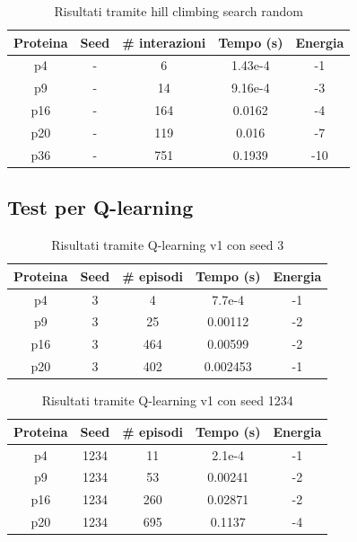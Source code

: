 \documentclass[conference]{IEEEtran}
\begin{document}
\begin{table}[H]
\begin{center}
\begin{tabular}{|c|c|c|c|c|}
\hline
\textbf{Proteina} & \textbf{Seed} & \textbf{\# interazioni} & \textbf{Tempo (s)} & \textbf{Energia} \\ \hline
p4 & - & 6 & 1.43e-4 & -1 \\ \hline
p9 & - & 14 & 9.16e-4 & -3 \\ \hline
p16 & - & 164 & 0.0162 & -4 \\ \hline
p20 & - & 119 & 0.016 & -7 \\ \hline
p36 & - & 751 & 0.1939 & -10 \\ \hline
\end{tabular}
\end{center}
\caption{Risultati tramite hill climbing search random}
\end{table}

\subsection{Test per Q-learning}

\begin{table}[H]
\begin{center}
\begin{tabular}{|c|c|c|c|c|}
\hline
\textbf{Proteina} & \textbf{Seed} & \textbf{\# episodi} & \textbf{Tempo (s)} & \textbf{Energia} \\ \hline
p4 & 3 & 4 & 7.7e-4 & -1 \\ \hline
p9 & 3 & 25 & 0.00112 & -2 \\ \hline
p16 & 3 & 464 & 0.00599 & -2 \\ \hline
p20 & 3 & 402 & 0.002453 & -1 \\ \hline
\end{tabular}
\end{center}
\caption{Risultati tramite Q-learning v1 con seed 3}
\end{table}

\begin{table}[H]
\begin{center}
\begin{tabular}{|c|c|c|c|c|}
\hline
\textbf{Proteina} & \textbf{Seed} & \textbf{\# episodi} & \textbf{Tempo (s)} & \textbf{Energia} \\ \hline
p4 & 1234 & 11 & 2.1e-4 & -1 \\ \hline
p9 & 1234 & 53 & 0.00241 & -2 \\ \hline
p16 & 1234 & 260 & 0.02871 & -2 \\ \hline
p20 & 1234 & 695 & 0.1137 & -4 \\ \hline
\end{tabular}
\end{center}
\caption{Risultati tramite Q-learning v1 con seed 1234}
\end{table}
\end{document}
